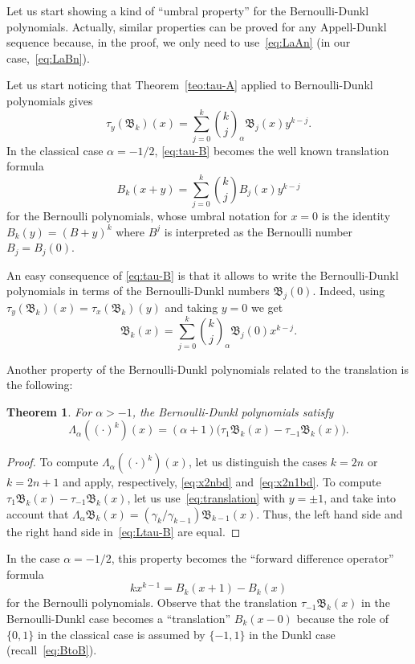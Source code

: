 \documentclass[10pt]{article}
\theoremstyle{plain}
\newtheorem{theorem}{Theorem}[section]
\theoremstyle{definition}
\numberwithin{equation}{section} %
\newcommand{\La}{\Lambda_{\alpha}}
\newcommand{\binoma}[2]{\binom{#1}{#2}_{\!\alpha}}
\newcommand{\B}{\mathfrak{B}}
\newcommand{\cc}{\gamma}
\begin{document}
Let us start showing a kind of ``umbral property'' for the Bernoulli-Dunkl polynomials. Actually, similar properties can be proved for any Appell-Dunkl sequence because, in the proof, we only need to use~\eqref{eq:LaAn} (in our case,~\eqref{eq:LaBn}). 

Let us start noticing that Theorem~\ref{teo:tau-A} applied to Bernoulli-Dunkl polynomials gives
\begin{equation}
\label{eq:tau-B}
  \tau_y(\B_k)(x)
  = \sum_{j=0}^k \binoma{k}{j} \B_j(x) y^{k-j}.
\end{equation}
In the classical case $\alpha=-1/2$, \eqref{eq:tau-B} becomes the well known translation formula
\[
  B_k(x+y) = \sum_{j=0}^k \binom{k}{j} B_j(x)y^{k-j}
\]
for the Bernoulli polynomials, whose umbral notation for $x=0$ is the identity $B_k(y)  = (B+y)^k$ where $B^j$ is interpreted as the Bernoulli number $B_j=B_j(0)$.

An easy consequence of \eqref{eq:tau-B} is that it allows to write the Bernoulli-Dunkl polynomials in terms of the Bernoulli-Dunkl numbers $\B_j(0)$. Indeed, using $\tau_y(\B_k)(x) = \tau_x(\B_k)(y)$  and taking $y=0$ we get
\begin{equation}
\label{eq:B_kpotx}
  \B_k(x) = \sum_{j=0}^k \binoma{k}{j} \B_j(0) x^{k-j}.
\end{equation}

Another property of the Bernoulli-Dunkl polynomials related to the translation is the following:

\begin{theorem}
\label{teo:Ltau-B}
For $\alpha>-1$, the Bernoulli-Dunkl polynomials satisfy
\begin{equation}
\label{eq:Ltau-B}
  \La((\cdot)^k)(x)
  = (\alpha+1) \big(\tau_1 \B_k(x) - \tau_{-1} \B_k(x)\big).
\end{equation}
\end{theorem}

\begin{proof}
To compute $\La((\cdot)^k)(x)$, let us distinguish the cases $k=2n$ or $k=2n+1$ and apply, respectively, \eqref{eq:x2nbd} and~\eqref{eq:x2n1bd}. To compute $\tau_1 \B_k(x) - \tau_{-1} \B_k(x)$, let us use~\eqref{eq:translation} with $y = \pm1$, and take into account that $\La \B_k(x) = (\cc_{k}/\cc_{k-1}) \B_{k-1}(x)$. Thus, the left hand side and the right hand side in~\eqref{eq:Ltau-B} are equal.
\end{proof}

In the case $\alpha=-1/2$, this property becomes the ``forward difference operator'' formula
\begin{equation}
\label{eq:Bx+1x}
  kx^{k-1} = B_k(x+1) - B_k(x)
\end{equation}
for the Bernoulli polynomials. Observe that the translation $\tau_{-1} \B_k(x)$ in the Bernoulli-Dunkl case becomes a ``translation'' $B_k(x-0)$ because the role of $\{0,1\}$ in the classical case is assumed by $\{-1,1\}$ in the Dunkl case (recall~\eqref{eq:BtoB}).
\end{document}
